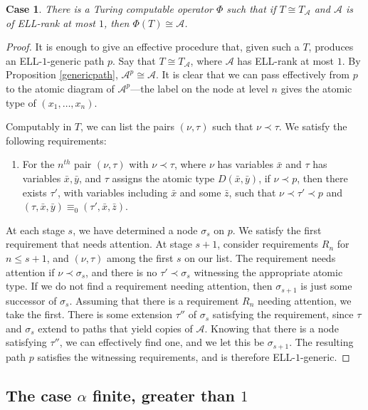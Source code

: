 \documentclass[10pt,a4paper]{article}
\newcommand{\ELL}{\textnormal{ELL}}
\newcounter{casecounter}
\newtheorem{case}[casecounter]{Case}
\theoremstyle{definition}
\begin{document}
	\begin{case}
		There is a Turing computable operator $\Phi$ such that if $T\cong T_\mathcal{A}$ and $\mathcal{A}$ is of \ELL-rank at most $1$, then $\Phi(T)\cong \mathcal{A}$.
	\end{case}
	\begin{proof}
		
		It is enough to give an effective procedure that, given such a $T$, produces an \ELL-$1$-generic path $p$. Say that $T\cong T_\mathcal{A}$, where $\mathcal{A}$ has \ELL-rank at most $1$. By Proposition \ref{genericpath}, $\mathcal{A}^p\cong\mathcal{A}$. It is clear that we can pass effectively from $p$ to the atomic diagram of $\mathcal{A}^p$---the label on the node at level $n$ gives the atomic type of $(x_1,\ldots,x_n)$.
		
		Computably in $T$, we can list the pairs $(\nu,\tau)$ such that $\nu\prec\tau$. We satisfy the following requirements:
		\begin{enumerate}
			\item[\textbf{$R_n$}:] For the $n^{th}$ pair $(\nu,\tau)$ with $\nu\prec\tau$, where $\nu$ has variables $\bar{x}$ and $\tau$ has variables $\bar{x},\bar{y}$, and $\tau$ assigns the atomic type $D(\bar{x},\bar{y})$, if $\nu\prec p$, then there exists $\tau'$, with variables including $\bar{x}$ and some $\bar{z}$, such that $\nu\prec\tau'\prec p$ and $(\tau,\bar{x},\bar{y})\equiv_0(\tau',\bar{x},\bar{z})$. 
		\end{enumerate} 
		
		At each stage $s$, we have determined a node $\sigma_s$ on $p$. We satisfy the first requirement that needs attention. At stage $s+1$, consider requirements $R_n$ for $n\leq s+1$, and $(\nu,\tau)$ among the first $s$ on our list. The requirement needs attention if $\nu\prec\sigma_s$, and there is no $\tau'\prec \sigma_s$ witnessing the appropriate atomic type. If we do not find a requirement needing attention, then $\sigma_{s+1}$ is just some successor of $\sigma_s$. Assuming that there is a requirement $R_n$ needing attention, we take the first. There is some extension $\tau''$ of $\sigma_s$ satisfying the requirement, since $\tau$ and $\sigma_s$ extend to paths that yield copies of $\mathcal{A}$. Knowing that there is a node satisfying $\tau''$, we can effectively find one, and we let this be $\sigma_{s+1}$. The resulting path $p$ satisfies the witnessing requirements, and is therefore \ELL-$1$-generic.
	\end{proof} 
	
	\subsection{The case $\alpha$ finite, greater than $1$} 
	
\end{document}
